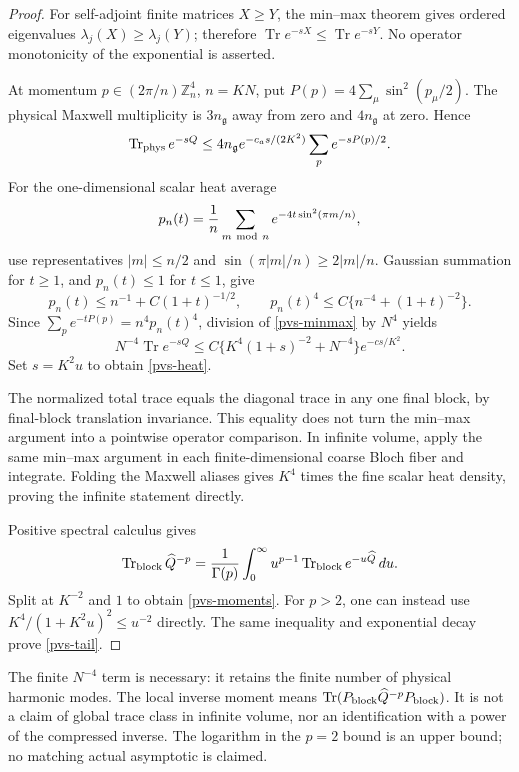 \documentclass[11pt]{article}
\theoremstyle{remark}
\begin{document}
\begin{proof}
For self-adjoint finite matrices \(X\ge Y\), the min--max theorem
gives ordered eigenvalues \(\lambda_j(X)\ge\lambda_j(Y)\);
therefore \(\operatorname{Tr}e^{-sX}\le
\operatorname{Tr}e^{-sY}\).
No operator monotonicity of the exponential is asserted.

At momentum \(p\in(2\pi/n)\mathbb Z_n^4\), \(n=KN\), put
\(P(p)=4\sum_\mu\sin^2(p_\mu/2)\).
The physical Maxwell multiplicity is \(3n_{\mathfrak g}\)
away from zero and \(4n_{\mathfrak g}\) at zero. Hence
\begin{equation}
 \operatorname{Tr}_{\rm phys}e^{-sQ}
 \le 4n_{\mathfrak g}e^{-c_as/(2K^2)}
                       \sum_p e^{-sP(p)/2}.
 \label{pvs-minmax}
\end{equation}
For the one-dimensional scalar heat average
\[
 p_n(t)=\frac1n\sum_{m\ {\rm mod}\ n}
                      e^{-4t\sin^2(\pi m/n)},
\]
use representatives \(|m|\le n/2\) and
\(\sin(\pi|m|/n)\ge2|m|/n\).
Gaussian summation for \(t\ge1\), and \(p_n(t)\le1\) for
\(t\le1\), give
\begin{equation}
 p_n(t)\le n^{-1}+C(1+t)^{-1/2},\qquad
 p_n(t)^4\le C\{n^{-4}+(1+t)^{-2}\}.
 \label{pvs-scalar-heat}
\end{equation}
Since \(\sum_p e^{-tP(p)}=n^4p_n(t)^4\),
division of \eqref{pvs-minmax} by \(N^4\) yields
\[
 N^{-4}\operatorname{Tr}e^{-sQ}
 \le C\{K^4(1+s)^{-2}+N^{-4}\}e^{-cs/K^2}.
\]
Set \(s=K^2u\) to obtain \eqref{pvs-heat}.

The normalized total trace equals the diagonal trace in any one
final block, by final-block translation invariance.
This equality does not turn the min--max argument into a
pointwise operator comparison.
In infinite volume, apply the same min--max argument in each
finite-dimensional coarse Bloch fiber and integrate.
Folding the Maxwell aliases gives \(K^4\) times the fine scalar
heat density, proving the infinite statement directly.

Positive spectral calculus gives
\[
 \operatorname{Tr}_{\rm block}\widehat Q^{-p}
  =\frac1{\Gamma(p)}\int_0^\infty
      u^{p-1}\operatorname{Tr}_{\rm block}e^{-u\widehat Q}\,du .
\]
Split at \(K^{-2}\) and \(1\) to obtain
\eqref{pvs-moments}.
For \(p>2\), one can instead use
\(K^4/(1+K^2u)^2\le u^{-2}\) directly.
The same inequality and exponential decay prove
\eqref{pvs-tail}.
\end{proof}

The finite \(N^{-4}\) term is necessary: it retains the finite
number of physical harmonic modes.
The local inverse moment means
\(\operatorname{Tr}(P_{\rm block}\widehat Q^{-p}P_{\rm block})\).
It is not a claim of global trace class in infinite volume, nor
an identification with a power of the compressed inverse.
The logarithm in the \(p=2\) bound is an upper bound; no matching
actual asymptotic is claimed.
\end{document}
